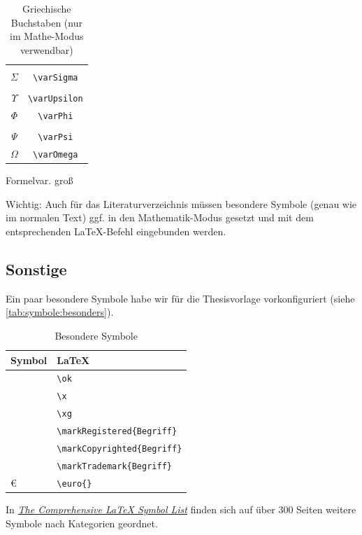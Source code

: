 \begin{table}[ht]
\begin{subtable}[b]{0.24\linewidth}
\begin{tabular}{c|c}
						&\\
						$\varSigma$ & \lstinline|\varSigma|\\
						&\\
						$\varUpsilon$ & \lstinline|\varUpsilon|\\
						$\varPhi$ & \lstinline|\varPhi|\\
						&\\
						$\varPsi$ & \lstinline|\varPsi|\\
						$\varOmega$ & \lstinline|\varOmega|
					\end{tabular}
					\caption{Formelvar. groß}
				\end{subtable}
								
				\caption[Griechische Buchstaben]{Griechische Buchstaben (nur im Mathe-Modus verwendbar)}
				\label{tab:symbole:griechisch}
			\end{table}
			
			Wichtig: Auch für das Literaturverzeichnis müssen besondere Symbole (genau wie im normalen Text) ggf. in den Mathematik-Modus gesetzt und mit dem entsprechenden \LaTeX-Befehl eingebunden werden.
		
		\subsection{Sonstige}
			Ein paar besondere Symbole habe wir für die Thesisvorlage vorkonfiguriert (siehe \autoref{tab:symbole:besonders}).
			\begin{table}[h]
				\begin{tabular}{l|l}
					Symbol & \LaTeX\\\hline
					\ok							& \lstinline|\ok|\\
					\x							& \lstinline|\x|\\
					\xg							& \lstinline|\xg|\\
					\markRegistered{Begriff}	& \lstinline|\markRegistered{Begriff}|\\
					\markCopyrighted{Begriff}	& \lstinline|\markCopyrighted{Begriff}|\\
					\markTrademark{Begriff}		& \lstinline|\markTrademark{Begriff}|\\
					\euro{}						& \lstinline|\euro{}|\\
				\end{tabular}
				\caption{Besondere Symbole}
				\label{tab:symbole:besonders}
			\end{table}
		
			In \href{http://tug.ctan.org/info/symbols/comprehensive/symbols-a4.pdf}{\emph{The Comprehensive \LaTeX{} Symbol List}} finden sich auf über 300 Seiten weitere Symbole nach Kategorien geordnet.
\clearpage
